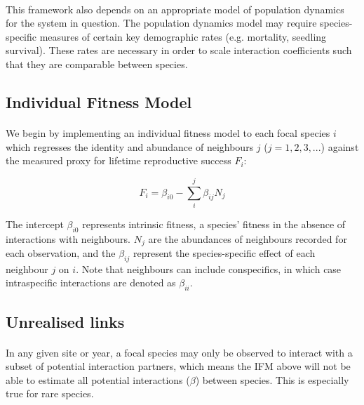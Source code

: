 \documentclass[a4,12pt]{article}
\begin{document}
    \paragraph{}   
    This framework also depends on an appropriate model of population dynamics for the system in question. The population dynamics model may require species-specific measures of certain key demographic rates (e.g. mortality, seedling survival). These rates are necessary in order to scale interaction coefficients such that they are comparable between species. 
    
    
    \subsection{Individual Fitness Model}
        
        \paragraph{}
        We begin by implementing an individual fitness model to each focal species $i$ which regresses the identity and abundance of neighbours $j$ ($j = 1, 2, 3, ...$) against the measured proxy for lifetime reproductive success $F_{i}$:
        
        \begin{equation}
        F_{i} = \beta_{i0} - \sum_{i}^{j} \beta_{ij} N_{j}
        \label{ifm}
        \end{equation}
        
        The intercept $\beta_{i0}$ represents intrinsic fitness, a species' fitness in the absence of interactions with neighbours. $N_{j}$ are the abundances of neighbours recorded for each observation, and the $\beta_{ij}$ represent the species-specific effect of each neighbour $j$ on $i$. Note that neighbours can include conspecifics, in which case intraspecific interactions are denoted as $\beta_{ii}$.
              
    \subsection{Unrealised links}
    
        \paragraph{}
        In any given site or year, a focal species may only be observed to interact with a subset of potential interaction partners, which means the IFM above will not be able to estimate all potential interactions ($\beta$) between species. This is especially true for rare species. %
        
\end{document}
